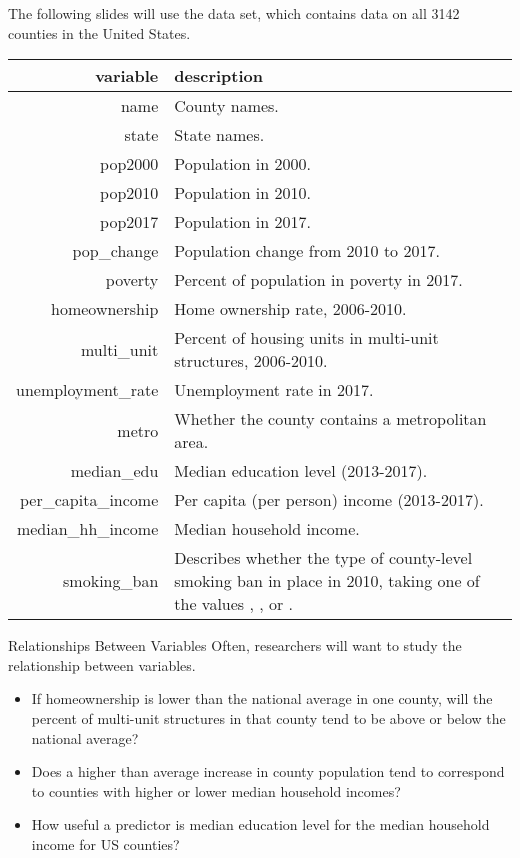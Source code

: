 \documentclass{beamer}
\begin{document}
\begin{frame}
\begin{data}
The following slides will use the  data set, which contains data on all 3142 counties in the United States.

\vspace{-5mm}
\begin{center}
\begin{tabular}{rp{9cm}}\hline
\textbf{variable} & \textbf{description} \\\hline
name	&	County names.	\\
state	&	State names.	\\
pop2000	&	Population in 2000.	\\
pop2010	&	Population in 2010.	\\
pop2017	&	Population in 2017.	\\
pop\_change	&	Population change from 2010 to 2017.	\\
poverty	&	Percent of population in poverty in 2017.	\\
homeownership	&	Home ownership rate, 2006-2010.	\\
multi\_unit	&	Percent of housing units in multi-unit structures, 2006-2010.	\\
unemployment\_rate	&	Unemployment rate in 2017.	\\
metro	&	Whether the county contains a metropolitan area.	\\
median\_edu	&	Median education level (2013-2017).	\\
per\_capita\_income	&	Per capita (per person) income (2013-2017).	\\
median\_hh\_income	&	Median household income.	\\
smoking\_ban	&	Describes whether the type of county-level smoking ban in place in 2010, taking one of the values \textquote{none}, \textquote{partial}, or \textquote{comprehensive}.	\\
\end{tabular}
\end{center}
\end{data}
\end{frame}

\begin{frame}
\begin{block}{Relationships Between Variables}
Often, researchers will want to study the relationship between variables.\pause

\begin{itemize}
\item If homeownership is lower than the national average in one county, will the percent of multi-unit structures in that county tend to be above or below the national average?\pause
\item Does a higher than average increase in county population tend to correspond to counties with higher or lower median household incomes?\pause
\item How useful a predictor is median education level for the median household income for US counties?
\end{itemize}
\end{block}
\end{frame}
\end{document}
